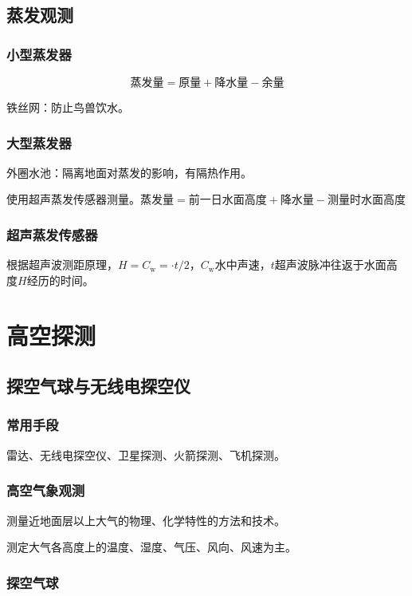 \documentclass[UTF8,11pt]{ctexbook}
\begin{document}
\section{蒸发观测}

\subsection{小型蒸发器}
\[
\text{蒸发量}=\text{原量}+\text{降水量}-\text{余量}
\]

铁丝网：防止鸟兽饮水。

\subsection{大型蒸发器}

外圈水池：隔离地面对蒸发的影响，有隔热作用。

使用超声蒸发传感器测量。\(\text{蒸发量}=\text{前一日水面高度}+\text{降水量}-\text{测量时水面高度}\)

\subsection{超声蒸发传感器}

根据超声波测距原理，\(H=C_\mathrm{w}=\cdot t/2\)，\(C_\mathrm{w}\)水中声速，\(t\)超声波脉冲往返于水面高度\(H\)经历的时间。

\chapter{高空探测}

\section{探空气球与无线电探空仪}

\subsection{常用手段}

雷达、无线电探空仪、卫星探测、火箭探测、飞机探测。

\subsection{高空气象观测}

测量近地面层以上大气的物理、化学特性的方法和技术。

测定大气各高度上的温度、湿度、气压、风向、风速为主。

\subsection{探空气球}
\end{document}
